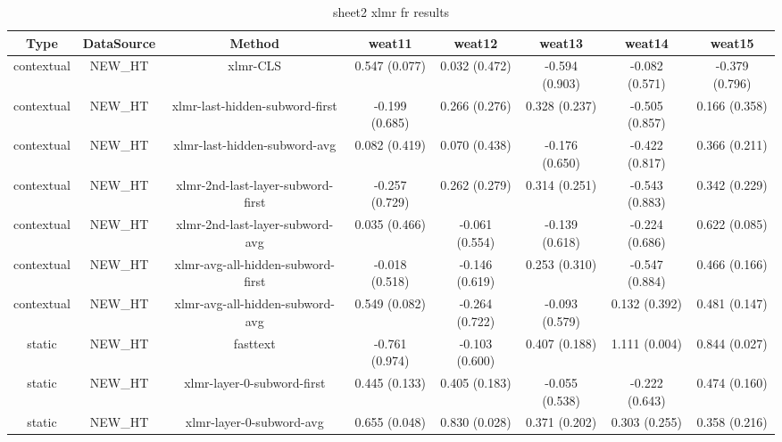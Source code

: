\begin{sidewaystable}[htb]
    \centering
    \caption{sheet2 xlmr fr results}
    \label{appendix_tab:sheet2_xlmr_fr_results}
    \small
    \begin{tabular}{@{}cccccccc@{}}
        \toprule
        Type & DataSource & Method & weat11 & weat12 & weat13 & weat14 & weat15 \\
        \midrule
        contextual & NEW\_HT & xlmr-CLS & 0.547 (0.077) & 0.032 (0.472) & -0.594 (0.903) & -0.082 (0.571) & -0.379 (0.796) \\
        contextual & NEW\_HT & xlmr-last-hidden-subword-first & -0.199 (0.685) & 0.266 (0.276) & 0.328 (0.237) & -0.505 (0.857) & 0.166 (0.358) \\
        contextual & NEW\_HT & xlmr-last-hidden-subword-avg & 0.082 (0.419) & 0.070 (0.438) & -0.176 (0.650) & -0.422 (0.817) & 0.366 (0.211) \\
        contextual & NEW\_HT & xlmr-2nd-last-layer-subword-first & -0.257 (0.729) & 0.262 (0.279) & 0.314 (0.251) & -0.543 (0.883) & 0.342 (0.229) \\
        contextual & NEW\_HT & xlmr-2nd-last-layer-subword-avg & 0.035 (0.466) & -0.061 (0.554) & -0.139 (0.618) & -0.224 (0.686) & 0.622 (0.085) \\
        contextual & NEW\_HT & xlmr-avg-all-hidden-subword-first & -0.018 (0.518) & -0.146 (0.619) & 0.253 (0.310) & -0.547 (0.884) & 0.466 (0.166) \\
        contextual & NEW\_HT & xlmr-avg-all-hidden-subword-avg & 0.549 (0.082) & -0.264 (0.722) & -0.093 (0.579) & 0.132 (0.392) & 0.481 (0.147) \\
        static & NEW\_HT & fasttext & -0.761 (0.974) & -0.103 (0.600) & 0.407 (0.188) & 1.111 (0.004) & 0.844 (0.027) \\
        static & NEW\_HT & xlmr-layer-0-subword-first & 0.445 (0.133) & 0.405 (0.183) & -0.055 (0.538) & -0.222 (0.643) & 0.474 (0.160) \\
        static & NEW\_HT & xlmr-layer-0-subword-avg & 0.655 (0.048) & 0.830 (0.028) & 0.371 (0.202) & 0.303 (0.255) & 0.358 (0.216) \\
        \bottomrule
    \end{tabular}
\end{sidewaystable}